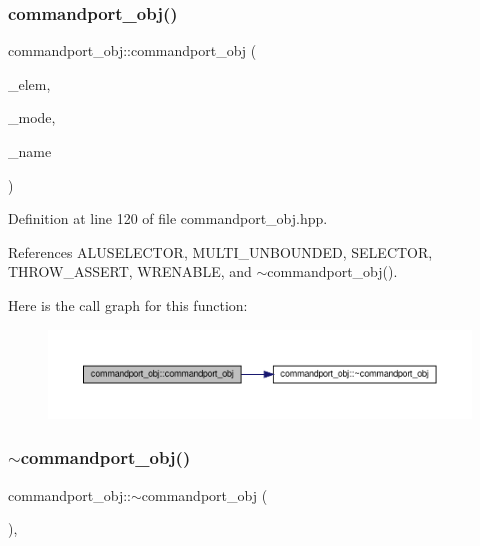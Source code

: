 \subsubsection{\texorpdfstring{commandport\+\_\+obj()}{commandport\_obj()}\hspace{0.1cm}{\footnotesize\ttfamily [2/2]}}
{\footnotesize\ttfamily commandport\+\_\+obj\+::commandport\+\_\+obj (\begin{DoxyParamCaption}\item[{\hyperlink{generic__obj_8hpp_acb533b2ef8e0fe72e09a04d20904ca81}{generic\+\_\+obj\+Ref}}]{\+\_\+elem,  }\item[{unsigned int}]{\+\_\+mode,  }\item[{const std\+::string \&}]{\+\_\+name }\end{DoxyParamCaption})\hspace{0.3cm}{\ttfamily [inline]}}



Definition at line 120 of file commandport\+\_\+obj.\+hpp.



References A\+L\+U\+S\+E\+L\+E\+C\+T\+OR, M\+U\+L\+T\+I\+\_\+\+U\+N\+B\+O\+U\+N\+D\+ED, S\+E\+L\+E\+C\+T\+OR, T\+H\+R\+O\+W\+\_\+\+A\+S\+S\+E\+RT, W\+R\+E\+N\+A\+B\+LE, and $\sim$commandport\+\_\+obj().

Here is the call graph for this function\+:
\nopagebreak
\begin{figure}[H]
\begin{center}
\leavevmode
\includegraphics[width=350pt]{d2/d56/classcommandport__obj_a1e7f9bee49cac57a8ef84dbc9c37a456_cgraph}
\end{center}
\end{figure}
\mbox{\label{classcommandport__obj_a6ac25c311a74ce97e4c703b336ae9981}} 
\subsubsection{\texorpdfstring{$\sim$commandport\+\_\+obj()}{~commandport\_obj()}}
{\footnotesize\ttfamily commandport\+\_\+obj\+::$\sim$commandport\+\_\+obj (\begin{DoxyParamCaption}{ }\end{DoxyParamCaption})\hspace{0.3cm}{\ttfamily [override]}, {\ttfamily [default]}}



